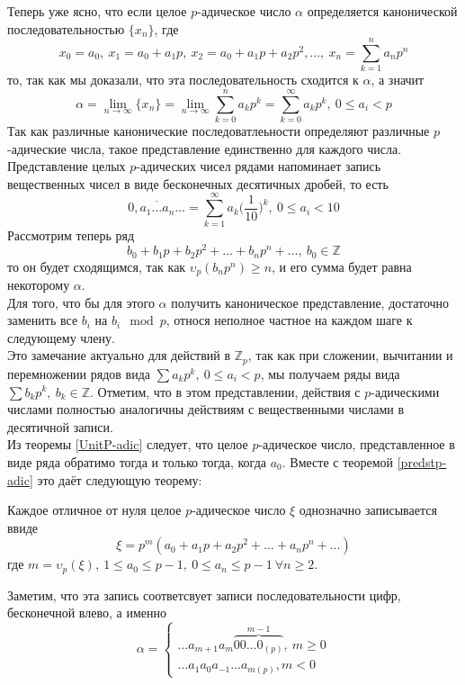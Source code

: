 \documentclass[11pt]{article}
\begin{document}
    Теперь уже ясно, что если целое $p$-адическое число $\alpha$ определяется канонической последовательностью $\{ x_n \}$, где
    \[ x_0 = a_0, \ x_1 = a_0 + a_1 p, \ x_2 = a_0 + a_1 p + a_2 p^2, \ldots, \ x_n = \sum\limits_{k = 1}^{n} a_n p^n \]
    то, так как мы доказали, что эта последовательность сходится к $\alpha$, а значит
    \[ \alpha = \lim\limits_{n \to \infty} \{ x_n \} = \lim\limits_{n \to \infty} \sum\limits_{k = 0}^{n} a_k p^k = \sum\limits_{k = 0}^{\infty} a_k p^k, \ 0 \le a_i < p \]
    Так как различные канонические последоватлеьности определяют различные $p$-адические числа, такое представление единственно для каждого числа.
    Представление целых $p$-адических чисел рядами напоминает запись вещественных чисел в виде бесконечных десятичных дробей, то есть
    \[ \overline{0, a_1 \ldots a_n \ldots } = \sum\limits_{k = 1}^{\infty} a_k \bigg(\frac{1}{10}\bigg)^k, \ 0 \le a_i < 10 \]
    Рассмотрим теперь ряд
    \[  b_0 + b_1 p + b_2 p^2 + \ldots + b_n p^n + \ldots, \ b_0 \in \mathbb{Z} \]
    то он будет сходящимся, так как $ \upsilon_p{(b_n p^n)} \ge n$, и его сумма будет равна некоторому $\alpha$.\\

    Для того, что бы для этого $\alpha$ получить каноническое представление, достаточно заменить все $b_i$ на $b_i \mod p$, относя неполное частное на каждом шаге к следующему
    члену. \\

    Это замечание актуально для действий в $\mathbb{Z}_p$, так как при сложении, вычитании и перемножении рядов вида $\sum a_k p^k, \ 0 \le a_i < p$, мы получаем ряды
    вида $\sum b_k p^k, \ b_k \in \mathbb{Z}$.
    Отметим, что в этом представлении, действия с $p$-адическими числами полностью аналогичны действиям с вещественными числами в десятичной записи.\\

    Из теоремы \ref{UnitP-adic} следует, что целое  $p$-адическое число, представленное в виде ряда обратимо тогда и только тогда, когда $a_0$. Вместе с теоремой \ref{predstp-adic}
    это даёт следующую теорему:

    \begin{theorem}
        Каждое отличное от нуля целое $p$-адическое число $\xi$ однозначно записывается ввиде
        \[ \xi = p^m(a_0 + a_1 p + a_2 p^2 + \ldots + a_n p^n + \ldots) \]
        где $m = \upsilon_p{(\xi)}, \ 1 \le a_0 \le p - 1, \ 0 \le a_n \le p - 1 \ \forall n \ge 2$.
    \end{theorem}
    Заметим, что эта запись соответсвует записи последовательности цифр, бесконечной влево, а именно
    \[ \alpha = \begin{cases}  \ldots a_{m + 1} a_m \overbrace{00\ldots0_{(p)}}^{m - 1}, \ m \ge 0 \\
        \ldots a_1 a_0 a_{-1} \ldots a_{m(p)}, m < 0 \end{cases}\]
\end{document}
